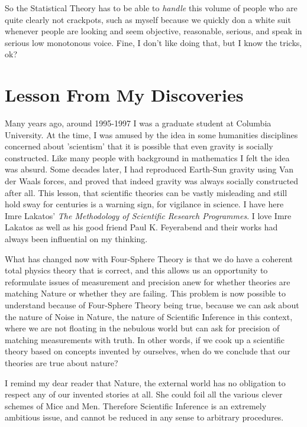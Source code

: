 \documentclass{amsart}
\begin{document}
So the Statistical Theory has to be able to {\em handle} this volume of people who are quite clearly not crackpots, such as myself because we quickly don a white suit whenever people are looking and seem objective, reasonable, serious, and speak in serious low monotonous voice.  Fine, I don't like doing that, but I know the tricks, ok?

\section{Lesson From My Discoveries}

Many years ago, around 1995-1997 I was a graduate student at Columbia University.  At the time, I was amused by the idea in some humanities disciplines concerned about 'scientism' that it is possible that even gravity is socially constructed.  Like many people with background in mathematics I felt the idea was absurd.  Some decades later, I had reproduced Earth-Sun gravity using Van der Waals forces, and proved that indeed gravity was always socially constructed after all.  This lesson, that scientific theories can be vastly misleading and still hold sway for centuries is a warning sign, for vigilance in science. I have here Imre Lakatos' {\em The Methodology of Scientific Research Programmes}.  I love Imre Lakatos as well as his good friend Paul K. Feyerabend and their works had always been influential on my thinking.

What has changed now with Four-Sphere Theory is that we do have a coherent total physics theory that is correct, and this allows us an opportunity to reformulate issues of measurement and precision anew for whether theories are matching Nature or whether they are failing.  This problem is now possible to understand because of Four-Sphere Theory being true, because we can ask about the nature of Noise in Nature, the nature of Scientific Inference in this context, where we are not floating in the nebulous world but can ask for precision of matching measurements with truth.  In other words, if we cook up a scientific theory based on concepts invented by ourselves, when do we conclude that our theories are true about nature?

I remind my dear reader that Nature, the external world has no obligation to respect any of our invented stories at all.  She could foil all the various clever schemes of Mice and Men.  Therefore Scientific Inference is an extremely ambitious issue, and cannot be reduced in any sense to arbitrary procedures.
\end{document}
